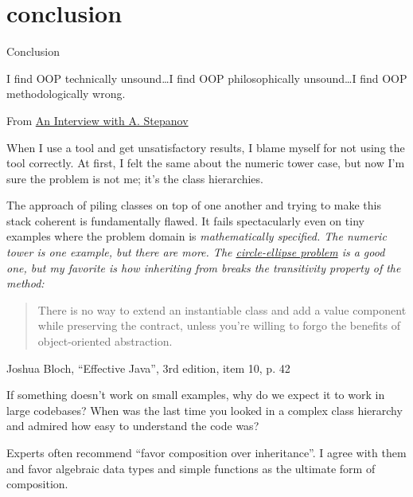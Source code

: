 \documentclass{article}
\begin{document}
\section{conclusion}{Conclusion}

\epigraph{I find OOP technically unsound\ldots  I find OOP philosophically unsound\ldots  I find OOP methodologically wrong.}{From \href{http://stlport.org/resources/StepanovUSA.html}{An Interview with A. Stepanov}}

When I use a tool and get unsatisfactory results, I blame myself for not using the tool correctly.
At first, I felt the same about the numeric tower case, but now I'm sure the problem is not me; it's the class hierarchies.

The approach of piling classes on top of one another and trying to make this stack coherent is fundamentally flawed.
It fails spectacularly even on tiny examples where the problem domain is \em{mathematically} specified.
The numeric tower is one example, but there are more.
The \href{https://en.wikipedia.org/wiki/Circle%E2%80%93ellipse_problem}{circle-ellipse problem} is a good one,
but my favorite is how inheriting  from  breaks the transitivity property of the  method:

\blockquote{
    There is no way to extend an instantiable class and add a value component while preserving the  contract,
    unless you're willing to forgo the benefits of object-oriented abstraction.
}{Joshua Bloch, ``Effective Java'', 3rd edition, item 10, p. 42}

If something doesn't work on small examples, why do we expect it to work in large codebases?
When was the last time you looked in a complex class hierarchy and admired how easy to understand the code was?

Experts often recommend ``favor composition over inheritance''.
I agree with them and favor algebraic data types and simple functions as the ultimate form of composition.
\end{document}
